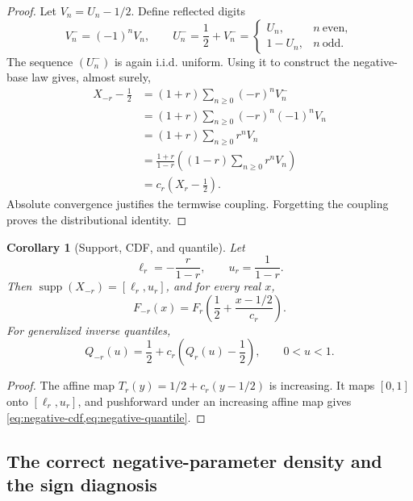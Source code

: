 \documentclass[11pt]{article}
\newtheorem{corollary}[theorem]{Corollary}
\theoremstyle{definition}
\newcommand{\supp}{\operatorname{supp}}
\begin{document}
\begin{proof}
Let \(V_n=U_n-1/2\).  Define reflected digits
\[
 V_n^-=(-1)^nV_n,
 \qquad
 U_n^-=\frac12+V_n^-=
 \begin{cases}
 U_n,&n\ \text{even},\\
 1-U_n,&n\ \text{odd}.
 \end{cases}
\]
The sequence \((U_n^-)\) is again i.i.d. uniform.  Using it to construct the negative-base
law gives, almost surely,
\begin{align*}
 X_{-r}-\frac12
  &=(1+r)\sum_{n\ge0}(-r)^nV_n^-\\
  &=(1+r)\sum_{n\ge0}(-r)^n(-1)^nV_n\\
  &=(1+r)\sum_{n\ge0}r^nV_n\\
  &=\frac{1+r}{1-r}\left((1-r)\sum_{n\ge0}r^nV_n\right)\\
  &=c_r\left(X_r-\frac12\right).
\end{align*}
Absolute convergence justifies the termwise coupling.  Forgetting the coupling proves
the distributional identity.
\end{proof}

\begin{corollary}[Support, CDF, and quantile]\label{cor:negative-cdf}
Let
\begin{equation}
 \ell_r=-\frac{r}{1-r},
 \qquad
 u_r=\frac{1}{1-r}.                                      \label{eq:negative-support}
\end{equation}
Then \(\supp(X_{-r})=[\ell_r,u_r]\), and for every real \(x\),
\begin{equation}
 \boxed{
 F_{-r}(x)=F_r\!\left(\frac12+\frac{x-1/2}{c_r}\right).}
                                                               \label{eq:negative-cdf}
\end{equation}
For generalized inverse quantiles,
\begin{equation}
 \boxed{
 Q_{-r}(u)=\frac12+c_r\left(Q_r(u)-\frac12\right),
 \qquad 0<u<1.}                                           \label{eq:negative-quantile}
\end{equation}
\end{corollary}

\begin{proof}
The affine map \(T_r(y)=1/2+c_r(y-1/2)\) is increasing.  It maps \([0,1]\) onto
\([\ell_r,u_r]\), and pushforward under an increasing affine map gives
\cref{eq:negative-cdf,eq:negative-quantile}.
\end{proof}

\subsection{The correct negative-parameter density and the sign diagnosis}
\end{document}
